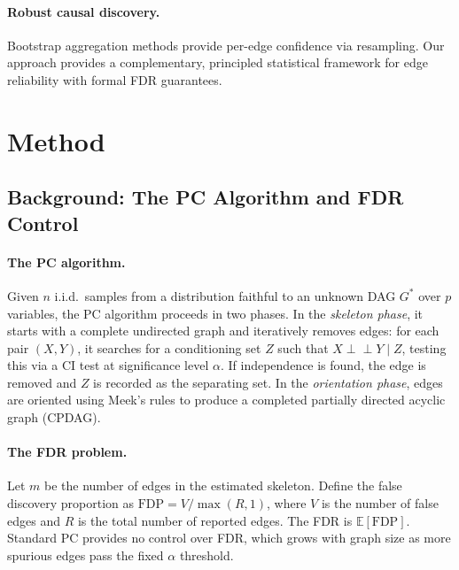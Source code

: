 \documentclass[11pt]{article}
\newcommand{\indep}{\perp\!\!\!\perp}
\newcommand{\E}{\mathbb{E}}
\begin{document}
\paragraph{Robust causal discovery.}
Bootstrap aggregation methods \citep{debeire2024bootstrap} provide per-edge confidence via resampling. Our approach provides a complementary, principled statistical framework for edge reliability with formal FDR guarantees.

\section{Method}
\label{sec:method}

\subsection{Background: The PC Algorithm and FDR Control}

\paragraph{The PC algorithm.}
Given $n$ i.i.d.\ samples from a distribution faithful to an unknown DAG $G^*$ over $p$ variables, the PC algorithm \citep{spirtes2000causation} proceeds in two phases. In the \emph{skeleton phase}, it starts with a complete undirected graph and iteratively removes edges: for each pair $(X, Y)$, it searches for a conditioning set $Z$ such that $X \indep Y \mid Z$, testing this via a CI test at significance level $\alpha$. If independence is found, the edge is removed and $Z$ is recorded as the separating set. In the \emph{orientation phase}, edges are oriented using Meek's rules to produce a completed partially directed acyclic graph (CPDAG).

\paragraph{The FDR problem.}
Let $m$ be the number of edges in the estimated skeleton. Define the false discovery proportion as $\text{FDP} = V / \max(R, 1)$, where $V$ is the number of false edges and $R$ is the total number of reported edges. The FDR is $\E[\text{FDP}]$. Standard PC provides no control over FDR, which grows with graph size as more spurious edges pass the fixed $\alpha$ threshold.
\end{document}
